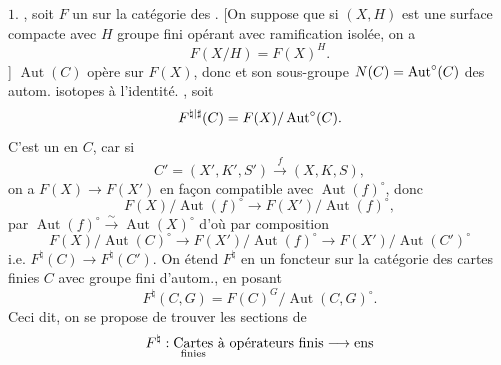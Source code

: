 $1.$ 
, soit $F$ un  sur la catégorie des
.
[On suppose que si $(X,H)$ est une surface compacte avec $H$ groupe fini opérant avec ramification isolée, on a
\[
F(X/H)=F(X)^H.
\]
]
$\operatorname{Aut}(C)$ opère sur $F(X)$, donc et son sous-groupe $N(C)=\operatorname{Aut}^\circ(C)$ des autom. isotopes à l’identité.
, soit
\[
F^{\natural|\sharp}(C)=F(X)/\operatorname{Aut}^\circ(C).
\]
C’est un  en $C$, car si
\[
C'=(X',K',S')\xrightarrow{f}(X,K,S),
\]
on a $F(X)\to F(X')$ 
en façon compatible avec $\operatorname{Aut}(f)^\circ$, donc
\[
F(X)/\operatorname{Aut}(f)^\circ\longrightarrow F(X')/\operatorname{Aut}(f)^\circ,
\]
par $\operatorname{Aut}(f)^\circ\xrightarrow{\sim}\operatorname{Aut}(X)^\circ$ d’où par composition
\[
F(X)/\operatorname{Aut}(C)^\circ\longrightarrow F(X')/\operatorname{Aut}(f)^\circ
\longrightarrow F(X')/\operatorname{Aut}(C')^\circ
\]
i.e. $F^\natural(C)\to F^\natural(C')$.
On étend $F^\natural$ en un foncteur sur la catégorie des cartes finies $C$ avec groupe fini d’autom., en posant
\[
F^\natural(C,G)=F(C)^G/\operatorname{Aut}(C,G)^\circ.
\]
Ceci dit, on se propose de trouver les sections de 
\[
F^\natural:\underset{\text{finies}}{\text{Cartes}}\ \text{à opérateurs}\ \inserted{\text{finis}}\longrightarrow\text{ens}
\]

